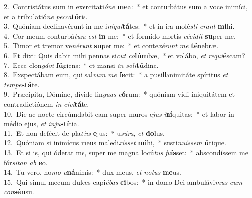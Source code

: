 {2.~}Contristátus sum in exercitati\textit{ó}\textit{ne} \textbf{me}a:~* et conturbátus sum a voce inimíci, et a tribulatió\textit{ne} \textit{pec}\textit{ca}\textbf{tó}ris.\\
{3.~}Quóniam declinavérunt in me i\textit{ni}\textit{qui}\textbf{tá}tes:~* et in ira molé\textit{sti} \textit{e}\textit{rant} \textbf{mi}hi.\\
{4.~}Cor meum conturbá\textit{tum} \textit{est} \textbf{in} me:~* et formído mortis \textit{cé}\textit{ci}\textit{dit} \textbf{su}per me.\\
{5.~}Timor et tremor ve\textit{né}\textit{runt} \textbf{su}per me:~* et conte\textit{xé}\textit{runt} \textit{me} \textbf{té}nebræ.\\
{6.~}Et dixi: Quis dabit mihi pennas si\textit{cut} \textit{co}\textbf{lúm}bæ,~* et volábo, \textit{et} \textit{re}\textit{qui}\textbf{é}scam?\\
{7.~}Ecce elon\textit{gá}\textit{vi} \textbf{fú}giens:~* et mansi \textit{in} \textit{so}\textit{li}\textbf{tú}dine.\\
{8.~}Exspectábam eum, qui sal\textit{vum} \textit{me} \textbf{fe}cit:~* a pusillanimitáte spíritus \textit{et} \textit{tem}\textit{pe}\textbf{stá}te.\\
{9.~}Præcípita, Dómine, dívide lin\textit{guas} \textit{e}\textbf{ó}rum:~* quóniam vidi iniquitátem et contradictiónem \textit{in} \textit{ci}\textit{vi}\textbf{tá}te.\\
{10.~}Die ac nocte circúmdabit eam super muros e\textit{jus} \textit{i}\textbf{ní}quitas:~* et labor in médio ejus, \textit{et} \textit{in}\textit{ju}\textbf{stí}tia.\\
{11.~}Et non defécit de pla\textit{té}\textit{is} \textbf{e}jus:~* u\textit{sú}\textit{ra}, \textit{et} \textbf{do}lus.\\
{12.~}Quóniam si inimícus meus maledi\textit{xís}\textit{set} \textbf{mi}hi,~* susti\textit{nu}\textit{ís}\textit{sem} \textbf{ú}tique.\\
{13.~}Et si is, qui óderat me, super me magna locú\textit{tus} \textit{fu}\textbf{ís}set:~* abscondíssem me fór\textit{si}\textit{tan} \textit{ab} \textbf{e}o.\\
{14.~}Tu vero, ho\textit{mo} \textit{u}\textbf{ná}nimis:~* dux meus, \textit{et} \textit{no}\textit{tus} \textbf{me}us.\\
{15.~}Qui simul mecum dulces capi\textit{é}\textit{bas} \textbf{ci}bos:~* in domo Dei ambulávi\textit{mus} \textit{cum} \textit{con}\textbf{sén}su.\\
